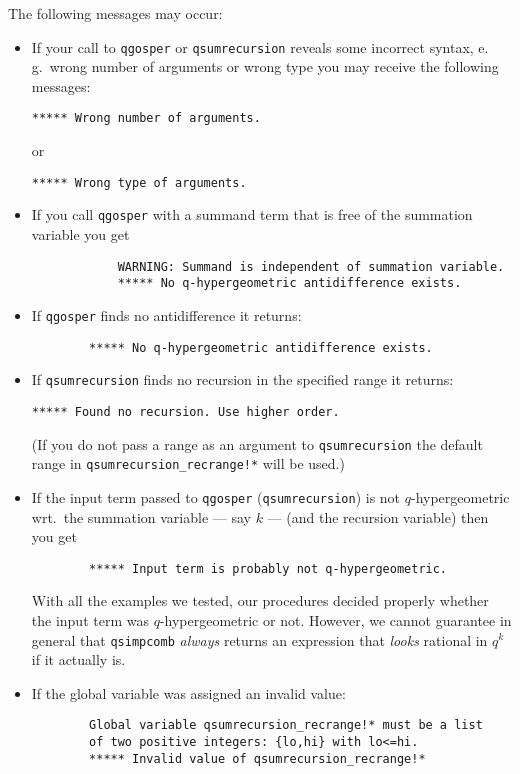 The following messages may occur:
\begin{itemize}
%
	\item If your call to \texttt{qgosper} or \texttt{qsumrecursion}
		reveals some incorrect syntax, e.\,g.\ wrong number of
		arguments or wrong type you may receive the following messages:
		\begin{verbatim}***** Wrong number of arguments.\end{verbatim}
		or
		\begin{verbatim}***** Wrong type of arguments.\end{verbatim}
%
	\item If you call \texttt{qgosper} with a summand term that
		is free of the summation variable you get
		\begin{verbatim}
			WARNING: Summand is independent of summation variable.
			***** No q-hypergeometric antidifference exists.
		\end{verbatim}
%
%
	\item If \texttt{qgosper} finds no antidifference it returns:
		\begin{verbatim}
		***** No q-hypergeometric antidifference exists.
		\end{verbatim}
%
	\item If \texttt{qsumrecursion} finds no recursion in the specified
		range it returns:
		\begin{verbatim}***** Found no recursion. Use higher order.\end{verbatim}
		(If you do not pass a range as an argument to \texttt{qsumrecursion}
		the default range in \texttt{qsumrecursion\_recrange!*} will be used.)
%
	\item If the input term passed to \texttt{qgosper}
		(\texttt{qsumrecursion}) is not $q$-hyper\-geometric wrt.\ the
		summation variable --- say $k$ --- (and the recursion variable)
		then you get
		\begin{verbatim}
		***** Input term is probably not q-hypergeometric.
		\end{verbatim}
		With all the examples we tested, our procedures decided properly
		whether the input term was $q$-hypergeometric or not. However, we
		cannot guarantee in general that \texttt{qsimpcomb} \emph{always} returns
		an expression that \emph{looks} rational in $q^k$ if it actually is.
%
	\item If the global variable  was
		assigned an invalid value:
		\begin{verbatim}
		Global variable qsumrecursion_recrange!* must be a list
		of two positive integers: {lo,hi} with lo<=hi.
		***** Invalid value of qsumrecursion_recrange!*
		\end{verbatim}
%
\end{itemize}
